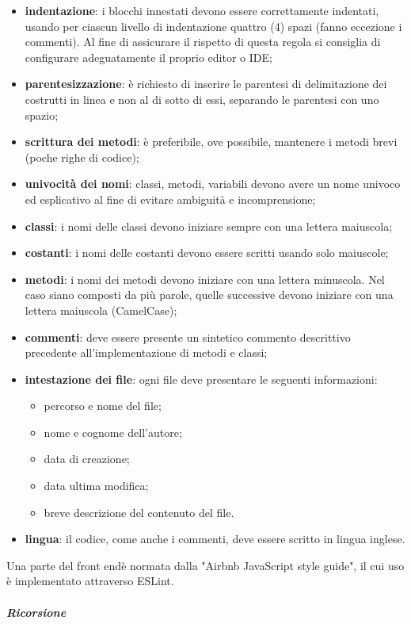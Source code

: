 				\begin{itemize}
					\item \textbf{indentazione}: i blocchi innestati devono essere correttamente 
						indentati, usando per ciascun livello di indentazione quattro (4) spazi (fanno 
						eccezione i commenti). Al fine di assicurare il rispetto di questa regola si 
						consiglia di configurare adeguatamente il proprio editor o IDE;
					\item \textbf{parentesizzazione}: è richiesto di inserire le parentesi di delimitazione dei costrutti in linea e non al di sotto di essi, separando le parentesi con uno spazio;
					\item \textbf{scrittura dei metodi}: è preferibile, ove possibile, 
						mantenere i metodi brevi (poche righe di codice);
					\item \textbf{univocità dei nomi}: classi, metodi, variabili devono avere un 
						nome univoco	ed esplicativo al fine di evitare ambiguità e incomprensione;
					\item \textbf{classi}: i nomi delle classi devono iniziare sempre con una 
						lettera maiuscola;		
					\item \textbf{costanti}: i nomi delle costanti devono essere scritti usando 
						solo maiuscole;
					\item \textbf{metodi}: i nomi dei metodi devono iniziare con una lettera 
						minuscola. Nel caso siano composti da più parole, quelle successive devono iniziare con una 
						lettera maiuscola (CamelCase\glo{});
					\item \textbf{commenti}: deve essere presente un sintetico commento descrittivo precedente all'implementazione di metodi e classi;
					\item \textbf{intestazione dei file}: ogni file deve presentare le seguenti informazioni:
						\begin{itemize}
							\item percorso e nome del file;
							\item nome e cognome dell'autore;
							\item data di creazione;
							\item data ultima modifica;
							\item breve descrizione del contenuto del file.
						\end{itemize}
					\item \textbf{lingua}: il codice, come anche i commenti, deve essere scritto 
						in lingua inglese.
				\end{itemize}
			Una parte del front end\glosp è normata dalla "Airbnb JavaScript style 
			guide", il cui uso è implementato attraverso ESLint\glo. \newline \newline
			\subparagraph*{Ricorsione}  \mbox{}\\
			
